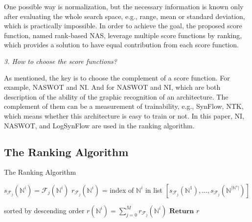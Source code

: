 \documentclass[sigconf]{acmart}
\begin{document}
    One possible way is normalization, but the necessary information is known only 
    after evaluating the whole search space, e.g., range, mean or standard deviation, which is practically 
    impossible. In order to achieve the goal, the proposed score function, named rank-based NAS, leverage 
    multiple score functions by ranking, which provides a solution to have equal contribution from each 
    score function. 

    \textit{3. How to choose the score functions?}

    As mentioned, the key is to choose the complement of a score function. For example, 
    NASWOT and NI. And for NASWOT and NI, which are both description of the ability of 
    the graphic recognition of an architecture. The complement of them can be a measurement 
    of trainability, e.g., SynFlow, NTK, which means whether this architecture is easy to 
    train or not. In this paper, NI, NASWOT, and LogSynFlow are used in the ranking algorithm. 

    \subsection{The Ranking Algorithm}
    \begin{algorithm}[h]
        \caption{The Ranking Algorithm}\label{alg:rank-based}
        \begin{algorithmic}[1]
                    \State $s_{{\mathcal F}_{j}}({\mathbb N}^i)={\mathcal F}_{j}({\mathbb N}^i)$
                \EndFor
            \EndFor
                \State $r_{{\mathcal F}_{j}}({\mathbb N}^i)$ = index of ${\mathbb N}^i$ in list $[s_{{\mathcal F}_{j}}({\mathbb N}^1),\ldots,s_{{\mathcal F}_{j}}({\mathbb N}^{\lvert {\mathbb N}^s\rvert})]$ \par sorted by descending order
            \EndFor
            \State $r({\mathbb N}^i)=\sum^M_{j=0} r_{{\mathcal F}_{j}}({\mathbb N}^i)$
            \State $\textbf{Return }r$
        \end{algorithmic}
    \end{algorithm}
\end{document}
